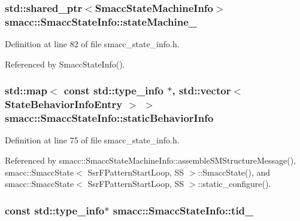 \subsubsection[{\texorpdfstring{state\+Machine\+\_\+}{stateMachine_}}]{\setlength{\rightskip}{0pt plus 5cm}std\+::shared\+\_\+ptr$<${\bf Smacc\+State\+Machine\+Info}$>$ smacc\+::\+Smacc\+State\+Info\+::state\+Machine\+\_\+}\hypertarget{classsmacc_1_1SmaccStateInfo_af9884b3fda41fbc87abf9908b8bd72e7}{}\label{classsmacc_1_1SmaccStateInfo_af9884b3fda41fbc87abf9908b8bd72e7}


Definition at line 82 of file smacc\+\_\+state\+\_\+info.\+h.



Referenced by Smacc\+State\+Info().

\subsubsection[{\texorpdfstring{static\+Behavior\+Info}{staticBehaviorInfo}}]{\setlength{\rightskip}{0pt plus 5cm}std\+::map$<$ const std\+::type\+\_\+info $\ast$, std\+::vector$<$ {\bf State\+Behavior\+Info\+Entry} $>$ $>$ smacc\+::\+Smacc\+State\+Info\+::static\+Behavior\+Info\hspace{0.3cm}{\ttfamily [static]}}\hypertarget{classsmacc_1_1SmaccStateInfo_a2cc62c6c9dec1a4f5294f8430efb71f2}{}\label{classsmacc_1_1SmaccStateInfo_a2cc62c6c9dec1a4f5294f8430efb71f2}


Definition at line 75 of file smacc\+\_\+state\+\_\+info.\+h.



Referenced by smacc\+::\+Smacc\+State\+Machine\+Info\+::assemble\+S\+M\+Structure\+Message(), smacc\+::\+Smacc\+State$<$ Ssr\+F\+Pattern\+Start\+Loop, S\+S $>$\+::\+Smacc\+State(), and smacc\+::\+Smacc\+State$<$ Ssr\+F\+Pattern\+Start\+Loop, S\+S $>$\+::static\+\_\+configure().

\subsubsection[{\texorpdfstring{tid\+\_\+}{tid_}}]{\setlength{\rightskip}{0pt plus 5cm}const std\+::type\+\_\+info$\ast$ smacc\+::\+Smacc\+State\+Info\+::tid\+\_\+}\hypertarget{classsmacc_1_1SmaccStateInfo_adaed55d2f9b823cd2ff0df04aaab1d1c}{}\label{classsmacc_1_1SmaccStateInfo_adaed55d2f9b823cd2ff0df04aaab1d1c}


